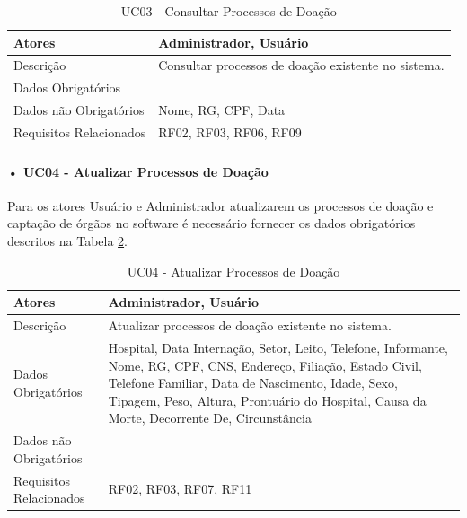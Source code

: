 \documentclass[portuguese,oneside]{tcc}
\begin{document}
\begin{table}
\centering
\caption{UC03 - Consultar Processos de Doação} \label{table:uc03}
\begin{tabular}{ |p{5cm}|p{5cm}|  }

\hline
Atores & 
Administrador, Usuário\\

\hline
Descrição & 
 
Consultar processos de doação existente no sistema.
 \\

\hline
Dados Obrigatórios & 
 \\

\hline
Dados não Obrigatórios & 
Nome, RG, CPF, Data
 \\

\hline
Requisitos Relacionados & 
RF02, RF03, RF06, RF09
 \\

\hline
\end{tabular}
\end{table}


\paragraph*{• UC04 - Atualizar Processos de Doação}
Para os atores Usuário e Administrador atualizarem os processos de doação e captação de órgãos no software é necessário fornecer os dados obrigatórios descritos na Tabela \ref{table:uc04}.

\begin{table}
\centering
\caption{UC04 - Atualizar Processos de Doação} \label{table:uc04}
\begin{tabular}{ |p{5cm}|p{5cm}|  }
\hline
Atores & 
Administrador, Usuário\\

\hline
Descrição & 
 
Atualizar processos de doação existente no sistema.
 \\

\hline
Dados Obrigatórios & 
Hospital, Data Internação, Setor, Leito, Telefone, Informante, Nome, RG, CPF, CNS, Endereço, Filiação, Estado Civil, Telefone Familiar, Data de Nascimento, Idade, Sexo, Tipagem, Peso, Altura, Prontuário do Hospital, Causa da Morte, Decorrente De, Circunstância
 \\

\hline
Dados não Obrigatórios & 
 \\

\hline
Requisitos Relacionados & 
RF02, RF03, RF07, RF11
 \\

\hline
\end{tabular}
\end{table}
\end{document}
